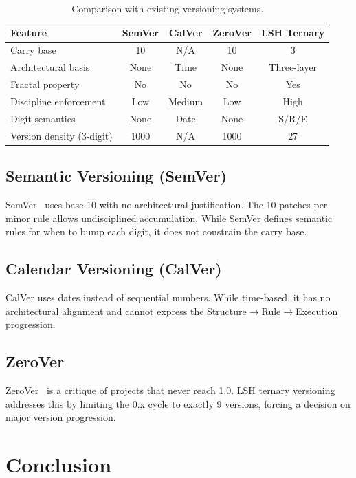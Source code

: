 \documentclass{article}
\begin{document}
\begin{table}[h]
\centering
\caption{Comparison with existing versioning systems.}
\label{tab:related}
\begin{tabular}{lcccc}
\toprule
\textbf{Feature} & \textbf{SemVer} & \textbf{CalVer} & \textbf{ZeroVer} & \textbf{LSH Ternary} \\
\midrule
Carry base & 10 & N/A & 10 & 3 \\
Architectural basis & None & Time & None & Three-layer \\
Fractal property & No & No & No & Yes \\
Discipline enforcement & Low & Medium & Low & High \\
Digit semantics & None & Date & None & S/R/E \\
Version density (3-digit) & 1000 & N/A & 1000 & 27 \\
\bottomrule
\end{tabular}
\end{table}

\subsection{Semantic Versioning (SemVer)}

SemVer~\cite{semver} uses base-10 with no architectural justification. The 10 patches per minor rule allows undisciplined accumulation. While SemVer defines semantic rules for when to bump each digit, it does not constrain the carry base.

\subsection{Calendar Versioning (CalVer)}

CalVer uses dates instead of sequential numbers. While time-based, it has no architectural alignment and cannot express the Structure$\to$Rule$\to$Execution progression.

\subsection{ZeroVer}

ZeroVer~\cite{zerover} is a critique of projects that never reach 1.0. LSH ternary versioning addresses this by limiting the 0.x cycle to exactly 9 versions, forcing a decision on major version progression.

\section{Conclusion}
\end{document}
